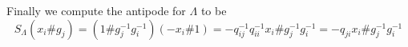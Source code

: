 \documentclass[12pt]{article}
\begin{document}
Finally we compute the antipode for $\Lambda$ to be
\[S_\Lambda(x_i\#g_j)=(1\# g_j^{-1}g_i^{-1})(-x_i\# 1)=-q_{ij}^{-1}q_{ii}^{-1}x_i\#g_j^{-1}g_i^{-1}=-q_{ji}x_i\#g_j^{-1}g_i^{-1}\]



\newpage

\printbibliography
\end{document}
